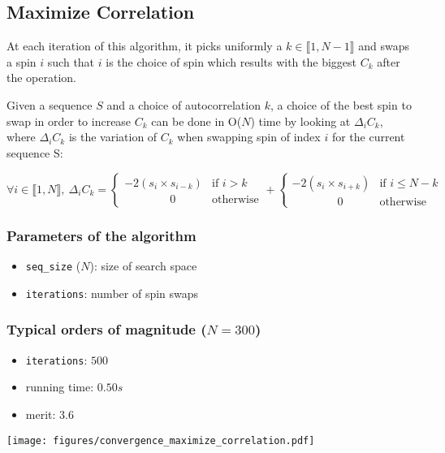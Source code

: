 \documentclass{article}
\begin{document}
\subsection{Maximize Correlation}

  At each iteration of this algorithm, it picks uniformly a $k \in \llbracket
  1, N-1 \rrbracket$ and swaps a spin $i$ such that $i$ is the choice of spin
  which results with the biggest $C_k$ after the operation.

  Given a sequence $S$ and a choice of autocorrelation $k$, a choice of the
  best spin to swap in order to increase $C_k$ can be done in O($N$) time by
  looking at $\Delta_i C_k$, where $\Delta_i C_k$ is the variation of $C_k$
  when swapping spin of index $i$ for the current sequence S:

    \[\forall i \in \llbracket 1, N \rrbracket,\  \Delta_i C_k =
      \begin{cases}
        -2 (s_i \times s_{i-k}) & \text{if } i > k \\
        \quad\quad\quad\quad  0 & \text{otherwise}
      \end{cases}
      +
      \begin{cases} 
        -2 (s_i \times s_{i+k}) & \text{if } i \leq N-k \\
        \quad\quad\quad\quad  0 & \text{otherwise}
      \end{cases}
   \]

  \pagebreak

  \begin{multicols}{2}
    \subsubsection*{Parameters of the algorithm}

      \begin{itemize}
        \item \texttt{seq\_size} ($N$): size of search space
        \item \texttt{iterations}: number of spin swaps
      \end{itemize}

    \subsubsection*{Typical orders of magnitude ($N = 300$)}

      \begin{itemize}
        \item \texttt{iterations}: $500$
        \item running time: $0.50s$
        \item merit: $3.6$
      \end{itemize}

    \vphantom{0}

  \columnbreak

    \texttt{[image: figures/convergence\_maximize\_correlation.pdf]}

  \end{multicols}
\end{document}
